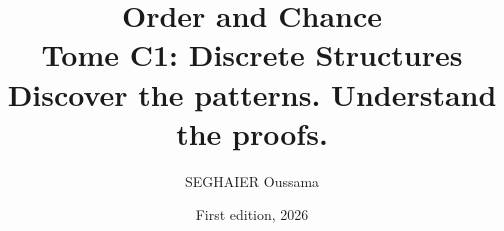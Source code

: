 \documentclass[11pt,openany]{book}
\title{\Huge\textbf{Order and Chance}\\[0.4em]\LARGE Tome C1: Discrete Structures\\[0.6em]
\Large Discover the patterns. Understand the proofs.}
\author{SEGHAIER Oussama}
\date{First edition, 2026}
\begin{document}
\frontmatter
\makecover
\maketitle

\tableofcontents

\mainmatter













\end{document}
